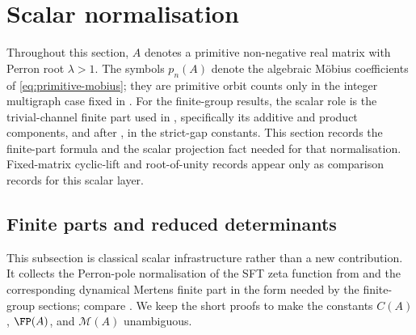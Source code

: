 \section{Scalar normalisation}
\label{sec:finite-part}

Throughout this section, \(A\) denotes a primitive non-negative real
matrix with Perron root \(\lambda>1\). The symbols \(p_n(A)\) denote the
algebraic M\"obius coefficients of \eqref{eq:primitive-mobius}; they are
primitive orbit counts only in the integer multigraph case fixed in
. For the finite-group results, the scalar role is the
trivial-channel finite part used in
, specifically its additive
and product components, and after , in the
strict-gap constants.
This section records the finite-part formula and the scalar projection fact
needed for that normalisation.  Fixed-matrix cyclic-lift and root-of-unity
records appear only as comparison records for this scalar layer.

\subsection{Finite parts and reduced determinants}

This subsection is classical scalar infrastructure rather than a new
contribution.  It collects the Perron-pole normalisation of the SFT zeta
function from  and the corresponding
dynamical Mertens finite part in the form needed by the finite-group
sections; compare \cite{BowenLanford1970Zeta,Parry1983PrimeOrbit,Sharp1991Mertens,LindMarcus1995,ParryPollicott1990Zeta}.  We keep the
short proofs to make the constants \(C(A)\), \(\FP(A)\), and
\(\mathcal M(A)\) unambiguous.


